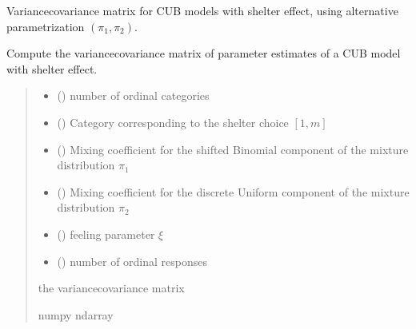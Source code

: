 \documentclass[letterpaper,10pt,english]{sphinxmanual}
\begin{document}
\begin{fulllineitems}
\label{\detokenize{cubmods:cubmods.cubsh.varcov}}
\pysigstartsignatures
{}
\pysigstopsignatures
\sphinxAtStartPar
Variance\sphinxhyphen{}covariance matrix for CUB models with shelter effect,
using alternative parametrization \((\pi_1, \pi_2)\).

\sphinxAtStartPar
Compute the variance\sphinxhyphen{}covariance matrix of parameter estimates of a CUB model with shelter effect.
\begin{quote}\begin{description}
\begin{itemize}
\item {} 
\sphinxAtStartPar
{} () \textendash{} number of ordinal categories

\item {} 
\sphinxAtStartPar
{} () \textendash{} Category corresponding to the shelter choice \([1,m]\)

\item {} 
\sphinxAtStartPar
{} () \textendash{} Mixing coefficient for the shifted Binomial component of the mixture distribution \(\pi_1\)

\item {} 
\sphinxAtStartPar
{} () \textendash{} Mixing coefficient for the discrete Uniform component of the mixture distribution \(\pi_2\)

\item {} 
\sphinxAtStartPar
{} () \textendash{} feeling parameter \(\xi\)

\item {} 
\sphinxAtStartPar
{} () \textendash{} number of ordinal responses

\end{itemize}

\sphinxAtStartPar
the variance\sphinxhyphen{}covariance matrix

\sphinxAtStartPar
numpy ndarray

\end{description}\end{quote}

\end{fulllineitems}
\end{document}
